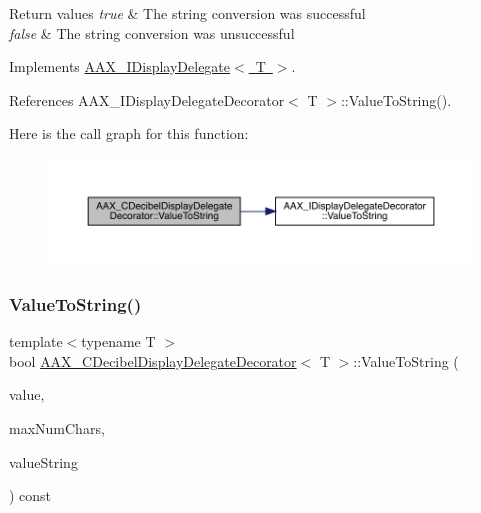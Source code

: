 \begin{DoxyRetVals}{Return values}
{\em true} & The string conversion was successful \\
\hline
{\em false} & The string conversion was unsuccessful \\
\hline
\end{DoxyRetVals}


Implements \mbox{\hyperlink{a01801_a7fd1e2f55055c817937bbfa66b73b2fd}{A\+A\+X\+\_\+\+I\+Display\+Delegate$<$ T $>$}}.



References A\+A\+X\+\_\+\+I\+Display\+Delegate\+Decorator$<$ T $>$\+::\+Value\+To\+String().

Here is the call graph for this function\+:
\nopagebreak
\begin{figure}[H]
\begin{center}
\leavevmode
\includegraphics[width=350pt]{a01469_a147cb1d0b62b0a62c6e3bb98daf80027_cgraph}
\end{center}
\end{figure}
\mbox{\label{a01469_ab301958be3d376757bf1bb88ded1c911}} 
\subsubsection{\texorpdfstring{ValueToString()}{ValueToString()}\hspace{0.1cm}{\footnotesize\ttfamily [2/2]}}
{\footnotesize\ttfamily template$<$typename T $>$ \\
bool \mbox{\hyperlink{a01469}{A\+A\+X\+\_\+\+C\+Decibel\+Display\+Delegate\+Decorator}}$<$ T $>$\+::Value\+To\+String (\begin{DoxyParamCaption}\item[{T}]{value,  }\item[{int32\+\_\+t}]{max\+Num\+Chars,  }\item[{\mbox{\hyperlink{a01573}{A\+A\+X\+\_\+\+C\+String}} $\ast$}]{value\+String }\end{DoxyParamCaption}) const\hspace{0.3cm}{\ttfamily [virtual]}}



